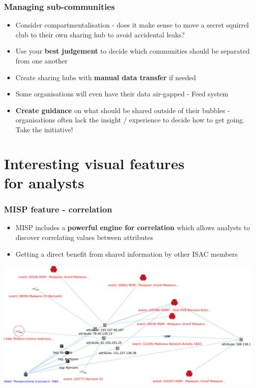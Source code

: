 \begin{frame}
	\frametitle{Managing sub-communities}
	\begin{itemize}
		\item Consider compartmentalisation - does it make sense to move a secret squirrel club to their own sharing hub to avoid accidental leaks?
		\item Use your \textbf{best judgement} to decide which communities should be separated from one another
		\item Create sharing hubs with \textbf{manual data transfer} if needed
		\item Some organisations will even have their data air-gapped - Feed system
		\item \textbf{Create guidance} on what should be shared outside of their bubbles - organisations often lack the insight / experience to decide how to get going. Take the initiative!
	\end{itemize}
\end{frame}

\section{Interesting visual features \\ for analysts}

\begin{frame}
    \frametitle{MISP feature - correlation}
    \begin{itemize}
        \item MISP includes a \textbf{powerful engine for correlation} which allows analysts to discover correlating values between attributes
        \item Getting a direct benefit from shared information by other ISAC members
    \end{itemize}
    \includegraphics[scale=0.20]{../images/correlation.png}
\end{frame}


